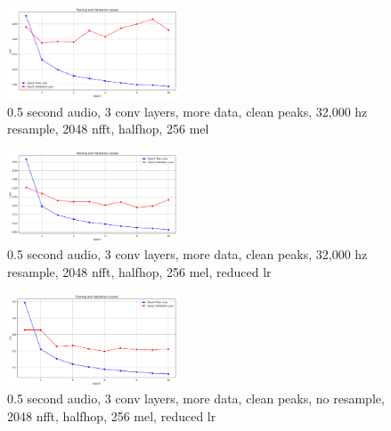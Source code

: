 \documentclass[twocolumn]{article}
\begin{document}
\begin{figure}
\centering
\includegraphics[width=0.45\textwidth]{figures/loss_plot_moredata_halfs_3conv_cleanpeaks_3200resample_2048nfft_halfhop_256nmel.png}
\caption{0.5 second audio, 3 conv layers, more data, clean peaks, 32,000 hz resample, 2048 nfft, halfhop, 256 mel}
\label{fig:halfs_3conv_moredata_cleanpeaks_3200resample_2048nfft_halfhop_256nmel}
\end{figure}

\begin{figure}
\centering
\includegraphics[width=0.45\textwidth]{figures/loss_plot_moredata_halfs_3conv_cleanpeaks_3200resample_2048nfft_halfhop_256nmel_drop_lr.png}
\caption{0.5 second audio, 3 conv layers, more data, clean peaks, 32,000 hz resample, 2048 nfft, halfhop, 256 mel, reduced lr}
\label{fig:halfs_3conv_moredata_cleanpeaks_3200resample_2048nfft_halfhop_256nmel_reduced_lr}
\end{figure}

\begin{figure}
\centering
\includegraphics[width=0.45\textwidth]{figures/loss_plot_moredata_halfs_3conv_cleanpeaks_noresample_2048nfft_halfhop_256nmel_drop_lr.png}
\caption{0.5 second audio, 3 conv layers, more data, clean peaks, no resample, 2048 nfft, halfhop, 256 mel, reduced lr}
\label{fig:loss_plot_moredata_halfs_3conv_cleanpeaks_noresample_2048nfft_halfhop_256nmel_drop_lr}
\end{figure}

\printbibliography
\end{document}
